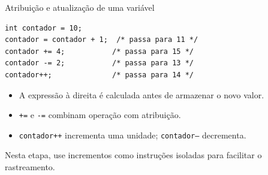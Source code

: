 \begin{frame}[fragile]{Atribuição e atualização de uma variável}
\begin{lstlisting}
int contador = 10;
contador = contador + 1;  /* passa para 11 */
contador += 4;           /* passa para 15 */
contador -= 2;           /* passa para 13 */
contador++;              /* passa para 14 */
\end{lstlisting}
\begin{itemize}
\item A expressão à direita é calculada antes de armazenar o novo valor.
\item \texttt{+=} e \texttt{-=} combinam operação com atribuição.
\item \texttt{contador++} incrementa uma unidade; \texttt{contador--} decrementa.
\end{itemize}
\small Nesta etapa, use incrementos como instruções isoladas para facilitar o rastreamento.
\end{frame}

